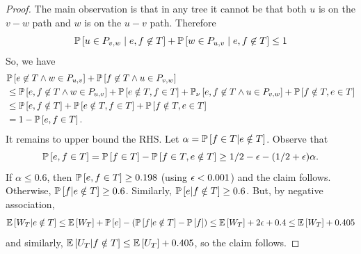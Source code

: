 \begin{proof}
	The main observation is that  in any tree it cannot be that both $u$ is on the $v-w$ path and $w$ is on the $u-v$ path. Therefore
	$$\P{u \in P_{v,w} \mid e,f \not\in T} + \P{w \in P_{u,v} \mid e,f \not\in T} \le 1$$
	So, we have
	\begin{align*}
		&\P{e \not\in T \wedge w \in P_{u,v}}+\P{f \not\in T \wedge u \in P_{v,w}} \\
		&\leq 	\P{e,f \not\in T \wedge w \in P_{u,v}}+\P{e\notin T,f\in T}+\PP{\nu}{e,f \not\in T \wedge u \in P_{v,w}}+\P{f\notin T,e\in T}\\
		&\leq  \P{e,f\notin T} + \P{e\notin T,f\in T} + \P{f\notin T, e\in T}\\
		&= 1-\P{e,f\in T}.
	\end{align*}
	It remains to upper bound the RHS. Let $\alpha=\P{f \in T| e\notin T}$. Observe that
	$$ \P{e,f\in T} = \P{f\in T} - \P{f\in T,e\notin T} \geq 1/2-\eps - (1/2+\eps)\alpha.$$
	If $\alpha\leq 0.6$, then $\P{e,f\in T} \geq 0.198$ (using $\eps<0.001$) and the claim follows.
	Otherwise, $\P{f | e\notin T}\geq 0.6$. Similarly, $\P{e | f\notin T}\geq 0.6$. But, by negative association, 
	$$\E{W_T | e\notin T}\leq\E{W_T}+ \P{e} - (\P{f |e\notin T}-\P{f}) \leq  \E{W_T}+2\eps+0.4\leq \E{W_T}+0.405$$ 
	and similarly,   $\E{U_T | f\notin T}\leq  \E{U_T}+0.405$, so the claim follows.
\end{proof}





